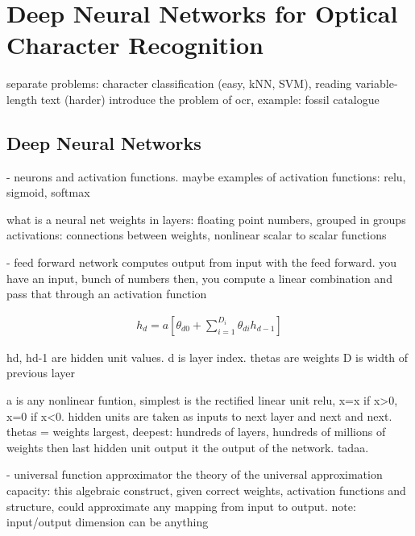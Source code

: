 \documentclass{article}
\begin{document}
\section{Deep Neural Networks for Optical Character Recognition}


separate problems: character classification (easy, kNN, SVM), reading variable-length text (harder) \cite{ocr_survey}
introduce the problem of ocr, example: fossil catalogue


\subsection{Deep Neural Networks}

- neurons and activation functions. maybe examples of activation functions: relu, sigmoid, softmax

what is a neural net
weights in layers: floating point numbers, grouped in groups 
activations: connections between weights, nonlinear scalar to scalar functions 

- feed forward
network computes output from input with the feed forward.
you have an input, bunch of numbers
then, you compute a linear combination and pass that through an activation function 

\begin{align}
h_d = a\left[ \theta_{d0} + \sum_{i=1}^{D_i}\theta_{di}h_{d-1} \right]
\end{align}

hd, hd-1 are hidden unit values. d is layer index. thetas are weights 
D is width of previous layer \cite{princebook}

a is any nonlinear funtion, simplest is the rectified linear unit relu, x=x if x>0, x=0 if x<0.
hidden units are taken as inputs to next layer and next and next. thetas = weights
largest, deepest: hundreds of layers, hundreds of millions of weights 
then last hidden unit output it the output of the network. tadaa.

- universal function approximator
the theory of the universal approximation capacity: this algebraic construct, 
given correct weights, activation functions and structure, could approximate 
any mapping from input to output. note: input/output dimension can be anything
\end{document}
